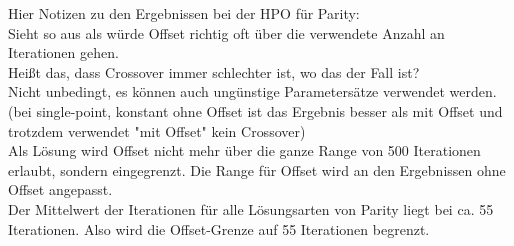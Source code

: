 Hier Notizen zu den Ergebnissen bei der HPO für Parity:\\
Sieht so aus als würde Offset richtig oft über die verwendete Anzahl an Iterationen gehen.\\
Heißt das, dass Crossover immer schlechter ist, wo das der Fall ist?\\
Nicht unbedingt, es können auch ungünstige Parametersätze verwendet werden. (bei single-point, konstant ohne Offset ist das Ergebnis besser als mit Offset und trotzdem verwendet "mit Offset" kein Crossover)\\
Als Lösung wird Offset nicht mehr über die ganze Range von 500 Iterationen erlaubt, sondern eingegrenzt. Die Range für Offset wird an den Ergebnissen ohne Offset angepasst.\\
Der Mittelwert der Iterationen für alle Lösungsarten von Parity liegt bei ca. 55 Iterationen. Also wird die Offset-Grenze auf 55 Iterationen begrenzt.
